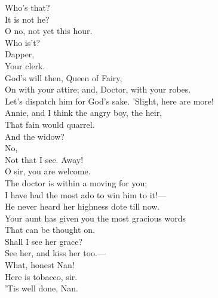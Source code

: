 \documentclass[a4paper,oneside,12pt]{memoir}
\begin{document}
\begin{drama*}
\facespeaks {} Who's that?\\
\subtlespeaks {} It is not he?\\
\facespeaks O no, not yet this hour.\\
\subtlespeaks {} Who is't?\\
\dolspeaks {} Dapper,\\
Your clerk.\\
\facespeaks {} God's will then, Queen of Fairy,\\
On with your attire; and, Doctor, with your robes.\\
Let's dispatch him for God's sake.
 'Slight, here are more!\\
Annie, and I think the angry boy, the heir,\\
That fain would quarrel.\\
\subtlespeaks {} And the widow?\\
\facespeaks {} No,\\
Not that I see. Away!\\
 O sir, you are welcome.\\
The doctor is within a moving for you;\\
I have had the most ado to win him to it!---\\
He never heard her highness dote till now.\\
Your aunt has given you the most gracious words\\
That can be thought on.\\
\dapperspeaks {} Shall I see her grace?\\
\facespeaks See her, and kiss her too.---\\
 What, honest Nan!\\
\druggerspeaks Here is tobacco, sir.\\
\facespeaks {} 'Tis well done, Nan.\\

\end{drama*}
\end{document}
